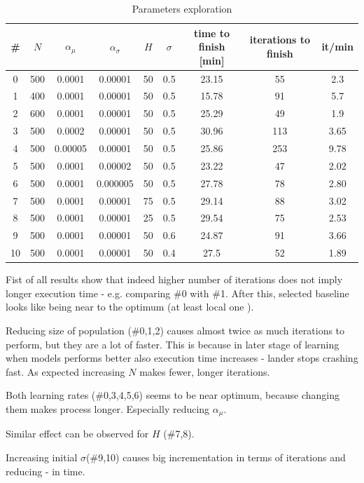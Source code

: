 \documentclass[12pt]{article}
\begin{document}
\begin{table}[!!h]
\centering
\begin{tabular}{|c|c|c|c|c|c|c|c|c|}
\hline 
\# & $N$	& $\alpha_\mu$	& $\alpha_\sigma$	& $H$	& $\sigma$ &	time to finish [min]&	iterations to finish & it/min\\
\hline
0 & 500     &  0.0001	& 0.00001	& 50	& 0.5	& 23.15 &	55   & 2.3 \\
1  & 400	&  0.0001	& 0.00001	& 50	& 0.5	& 15.78 &	91   & 5.7\\
2  & 600	&  0.0001	& 0.00001	& 50	& 0.5	& 25.29 &	49   & 1.9\\
3  & 500	&  0.0002	& 0.00001	& 50	& 0.5	& 30.96 &	113  &  3.65\\
4  & 500	&  0.00005	& 0.00001	& 50	& 0.5	& 25.86 &	253  &  9.78\\
5  & 500	&  0.0001	& 0.00002	& 50	& 0.5	& 23.22 &	47   & 2.02\\
6  & 500	&  0.0001	& 0.000005 & 	50 	& 0.5	& 27.78 &	78   & 2.80\\
7  & 500	&  0.0001	& 0.00001	& 75	& 0.5	& 29.14 &	88   & 3.02\\
8  & 500	&  0.0001	& 0.00001	& 25	& 0.5	& 29.54 &	75   & 2.53\\
9  & 500	&  0.0001	& 0.00001	& 50	& 0.6	& 24.87 &	91   & 3.66\\
10 &  500&     0.0001	& 0.00001	& 50	& 0.4	&  27.5 &	52   & 1.89\\
\hline
\end{tabular} 
\caption{Parameters exploration}
\end{table}
Fist of all results show that indeed higher number of iterations does not imply longer execution time - e.g. comparing \#0 with \#1. After this, selected baseline looks like being near to the optimum (at least local one ).

Reducing size of population (\#0,1,2) causes almost twice as much iterations to perform, but they are a lot of faster. This is because in later stage of learning when models performs better also execution time increases - lander stops crashing fast. As expected increasing $N$ makes fewer, longer iterations.

Both learning rates (\#0,3,4,5,6) seems to be near optimum, because changing them makes process longer. Especially reducing $\alpha_\mu$.

Similar effect can be observed for $H$ (\#7,8).

Increasing initial $\sigma$(\#9,10) causes big incrementation in terms of iterations and reducing - in time. 
\end{document}
